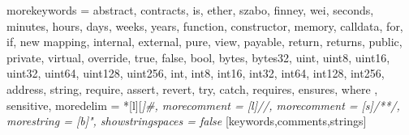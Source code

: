 


%
{morekeywords = {
  abstract, contracts, is,
  ether, szabo, finney, wei,
  seconds, minutes, hours, days, weeks, years,
  function, constructor, memory, calldata,
  for, if, new
  mapping,
  internal, external, pure, view, payable, return, returns,
  public, private, virtual, override,
  true, false, bool,
  bytes, bytes32,
  uint, uint8, uint16, uint32, uint64, uint128, uint256,
  int, int8, int16, int32, int64, int128, int256,
  address, string,
  require, assert, revert, try, catch,
  requires, ensures, where
  },%
  sensitive,%
  moredelim = *[l][\itshape]{\#},
  morecomment = [l]//,%
  morecomment = [s]{/*}{*/},%
  morestring = [b]",%
  showstringspaces = false%
}[keywords,comments,strings]%



